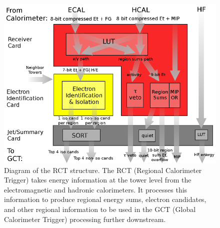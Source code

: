 \begin{figure}[htb]
  \begin{center}
    \includegraphics[width=400pt]{Figures/RCT-structure-new-small.png} 
  \end{center}
  \caption[\fixspacing Diagram of the RCT structure]
	  {\fixspacing Diagram of the RCT structure.
	    The RCT (Regional Calorimeter Trigger) takes energy 
	    information at the tower level from the electromagnetic 
	    and hadronic calorimeters.  
	    It processes this information to produce 
	    regional energy sums, electron candidates, 
	    and other regional information to be 
	    used in the GCT (Global Calorimeter Trigger) 
	    processing further downstream.
	  }
	  \label{fig:RCTStructure}
\end{figure}

